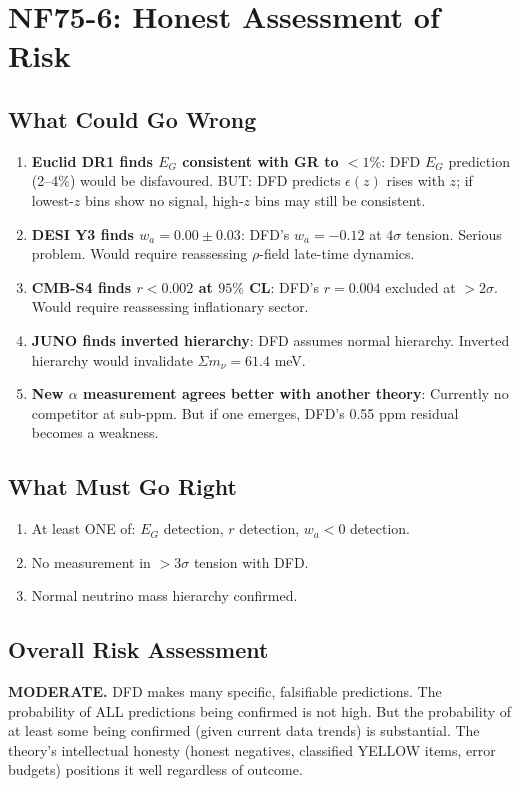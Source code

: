 \documentclass[11pt,a4paper]{article}
\begin{document}
\section{NF75-6: Honest Assessment of Risk}

\subsection{What Could Go Wrong}
\begin{enumerate}
\item \textbf{Euclid DR1 finds $E_G$ consistent with GR to $< 1\%$}: DFD $E_G$ prediction (2--4\%) would be disfavoured. BUT: DFD predicts $\epsilon(z)$ rises with $z$; if lowest-$z$ bins show no signal, high-$z$ bins may still be consistent.
\item \textbf{DESI Y3 finds $w_a = 0.00 \pm 0.03$}: DFD's $w_a = -0.12$ at $4\sigma$ tension. Serious problem. Would require reassessing $\rho$-field late-time dynamics.
\item \textbf{CMB-S4 finds $r < 0.002$ at $95\%$ CL}: DFD's $r = 0.004$ excluded at $> 2\sigma$. Would require reassessing inflationary sector.
\item \textbf{JUNO finds inverted hierarchy}: DFD assumes normal hierarchy. Inverted hierarchy would invalidate $\Sigma m_\nu = 61.4$ meV.
\item \textbf{New $\alpha$ measurement agrees better with another theory}: Currently no competitor at sub-ppm. But if one emerges, DFD's 0.55 ppm residual becomes a weakness.
\end{enumerate}

\subsection{What Must Go Right}
\begin{enumerate}
\item At least ONE of: $E_G$ detection, $r$ detection, $w_a < 0$ detection.
\item No measurement in $> 3\sigma$ tension with DFD.
\item Normal neutrino mass hierarchy confirmed.
\end{enumerate}

\subsection{Overall Risk Assessment}
\textbf{MODERATE.} DFD makes many specific, falsifiable predictions. The probability of ALL predictions being confirmed is not high. But the probability of at least some being confirmed (given current data trends) is substantial. The theory's intellectual honesty (honest negatives, classified YELLOW items, error budgets) positions it well regardless of outcome.
\end{document}
